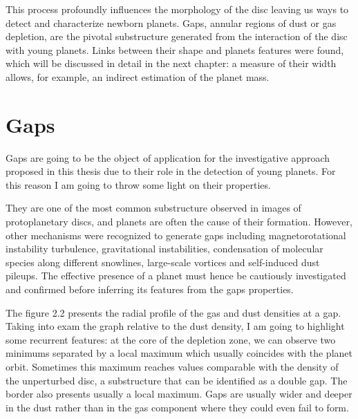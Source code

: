\documentclass[a4paper,10pt]{report}
\begin{document}
This process profoundly influences the morphology of the disc leaving us ways to detect and characterize newborn planets. 
Gaps, annular regions of dust or gas depletion, are the pivotal substructure generated from the interaction of the disc with young planets.
Links between their shape and planets features were found, which will be discussed in detail in the next chapter:
a measure of their width allows, for example, an indirect estimation of the planet mass.

\section{Gaps}

Gaps are going to be the object of application for the investigative approach proposed in this thesis due
to their role in the detection of young planets.
For this reason I am going to throw some light on their properties.

They are one of the most common substructure observed in images of protoplanetary discs, and
planets are often the cause of their formation. However, other mechanisms were recognized to generate gaps
including magnetorotational instability turbulence, gravitational instabilities, condensation of molecular species along different snowlines,
large-scale vortices and self-induced dust pileups. The effective presence of a planet must hence be cautiously investigated and confirmed 
before inferring its features from the gaps properties. 

The figure 2.2 presents the radial profile of the gas and dust densities at a gap. Taking into exam 
the graph relative to the dust density, I am going to highlight some recurrent features:
at the core of the depletion zone, we can observe two minimums separated by a local maximum which usually coincides with the planet orbit.
Sometimes this maximum reaches values comparable with the density of the unperturbed disc, a substructure that can be identified as a double gap. 
The border also presents usually a local maximum. Gaps are usually wider and deeper in the dust rather than in the gas component where they could even
fail to form.
\end{document}
